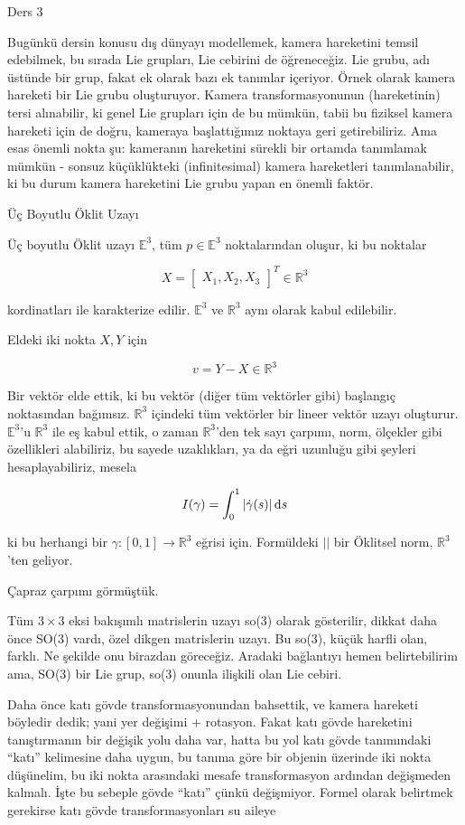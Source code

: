 \documentclass[12pt,fleqn]{article}\usepackage{../../common}
\begin{document}
Ders 3

Bugünkü dersin konusu dış dünyayı modellemek, kamera hareketini temsil
edebilmek, bu sırada Lie grupları, Lie cebirini de öğreneceğiz. Lie grubu,
adı üstünde bir grup, fakat ek olarak bazı ek tanımlar içeriyor. Örnek
olarak kamera hareketi bir Lie grubu oluşturuyor. Kamera transformasyonunun
(hareketinin) tersi alınabilir, ki genel Lie grupları için de bu mümkün,
tabii bu fiziksel kamera hareketi için de doğru, kameraya başlattığımız
noktaya geri getirebiliriz. Ama esas önemli nokta şu: kameranın hareketini
sürekli bir ortamda tanımlamak mümkün - sonsuz küçüklükteki (infinitesimal)
kamera hareketleri tanımlanabilir, ki bu durum kamera hareketini Lie grubu
yapan en önemli faktör.

Üç Boyutlu Öklit Uzayı

Üç boyutlu Öklit uzayı $\mathbb{E}^3$, tüm $p \in \mathbb{E}^3$ noktalarından oluşur, ki bu noktalar

$$ X = \left[\begin{array}{ccc} X_1,X_2,X_3 \end{array}\right]^T \in \mathbb{R}^3$$

kordinatları ile karakterize edilir. $\mathbb{E}^3$ ve $\mathbb{R}^3$ aynı
olarak kabul edilebilir. 

Eldeki iki nokta $X,Y$ için

$$ v = Y - X \in \mathbb{R}^3$$

Bir vektör elde ettik, ki bu vektör (diğer tüm vektörler gibi) başlangıç
noktasından bağımsız. $\mathbb{R}^3$ içindeki tüm vektörler bir lineer
vektör uzayı oluşturur. $\mathbb{E}^3$'u $\mathbb{R}^3$ ile eş kabul ettik,
o zaman $\mathbb{R}^3$'den tek sayı çarpımı, norm, ölçekler gibi
özellikleri alabiliriz, bu sayede uzaklıkları, ya da eğri uzunluğu gibi
şeyleri hesaplayabiliriz, mesela 

$$ I(\gamma) = \int_{0}^{1} | \dot{\gamma}(s)| \,\mathrm{d} s $$

ki bu herhangi bir $\gamma: [0,1] \to \mathbb{R}^3$ eğrisi için. Formüldeki $||$
bir Öklitsel norm, $\mathbb{R}^3$'ten geliyor.

Çapraz çarpımı görmüştük.

Tüm $3 \times 3$ eksi bakışımlı matrislerin uzayı so(3) olarak gösterilir,
dikkat daha önce SO(3) vardı, özel dikgen matrislerin uzayı. Bu so(3),
küçük harfli olan, farklı. Ne şekilde onu birazdan göreceğiz. Aradaki
bağlantıyı hemen belirtebilirim ama, SO(3) bir Lie grup, so(3) onunla
ilişkili olan Lie cebiri. 

Daha önce katı gövde transformasyonundan bahsettik, ve kamera hareketi
böyledir dedik; yani yer değişimi + rotasyon. Fakat katı gövde hareketini
tanıştırmanın bir değişik yolu daha var, hatta bu yol katı gövde
tanımındaki ``katı'' kelimesine daha uygun, bu tanıma göre bir objenin
üzerinde iki nokta düşünelim, bu iki nokta arasındaki mesafe transformasyon
ardından değişmeden kalmalı. İşte bu sebeple gövde ``katı'' çünkü
değişmiyor. Formel olarak belirtmek gerekirse katı gövde transformasyonları
su aileye
\end{document}

